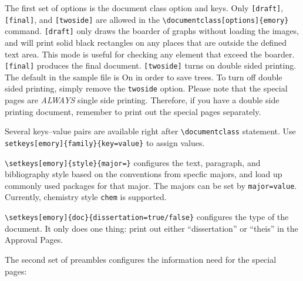 \documentclass[draft,twoside]{emory}
\begin{document}
The first set of options is the document class option and keys. Only \verb|[draft]|,
\verb|[final]|, and \verb|[twoside]| are allowed in the \verb|\documentclass[options]{emory}| 
command. \verb|[draft]| only draws the boarder of graphs without loading the images,
and will print solid black rectangles on any places that are outside the defined
text area. This mode is useful for checking any element that exceed the boarder.
\verb|[final]| produces the final document. \verb|[twoside]| turns on double sided
printing. The default in the sample file is On in order to save trees. To turn
off double sided printing, simply remove the \verb|twoside| option.
Please note that the special pages are \emph{ALWAYS} single side printing. 
Therefore, if you have a double side printing document, remember to print out
the special pages separately.

Several keys--value pairs are available right after \verb|\documentclass| statement.
Use \verb|setkeys[emory]{family}{key=value}| to assign values.

\verb|\setkeys[emory]{style}{major=}| configures the text, paragraph, and 
bibliography style based on the conventions
from specfic majors, and load up commonly used packages for that major.
The majors can be set by \verb|major=value|.
Currently, chemistry style \verb|chem| is supported. 


\verb|\setkeys[emory]{doc}{dissertation=true/false}| configures the type of the 
document. It only does one thing: print out either ``dissertation'' or ``theis''
in the Approval Pages.


The second set of preambles configures the information need for the special pages:
\end{document}
